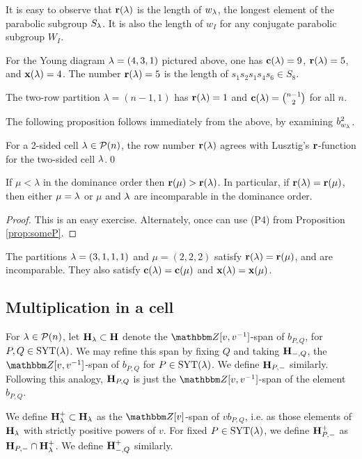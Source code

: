 It is easy to observe that $\mathbf{r}(\lambda)$ is the length of $w_\lambda$, the longest element of the parabolic subgroup $S_\lambda$. It is also the length of $w_I$ for any conjugate parabolic subgroup $W_I$.

\begin{example} For the Young diagram $\lambda=(4,3,1)$ pictured above, one has $\mathbf{c}(\lambda) = 9$, $\mathbf{r}(\lambda) = 5$, and $\mathbf{x}(\lambda)=4$. The number $\mathbf{r}(\lambda)=5$ is the length of $s_1 s_2 s_1 s_4 s_6 \in S_8$.  \end{example}

\begin{example}
The two-row partition $\lambda=(n-1,1)$ has $\mathbf{r}(\lambda)=1$ and $\mathbf{c}(\lambda)=\binom{n-1}{2}$ for all $n$.
\end{example}

The following proposition follows immediately from the above, by examining $b_{w_\lambda}^2$.

\begin{proposition}\label{prop:abEqualsrb} For a 2-sided cell $\lambda \in {\mathcal{P}}(n)$, the row number $\mathbf{r}(\lambda)$ agrees with Lusztig's $\mathbf{r}$-function for the two-sided cell $\lambda$.\qed
\end{proposition}

\begin{lemma} \label{lem:rowOrder}
If $\mu < \lambda$ in the dominance order then $\mathbf{r}(\mu) > \mathbf{r}(\lambda)$. In particular, if $\mathbf{r}(\lambda)=\mathbf{r}(\mu)$, then either $\mu=\lambda$ or $\mu$ and $\lambda$ are incomparable in the dominance order. \end{lemma}

\begin{proof} This is an easy exercise.  Alternately, once can use (P4) from Proposition \ref{prop:someP}. \end{proof}

\begin{example} The partitions $\lambda=(3,1,1,1)$ and $\mu=(2,2,2)$ satisfy $\mathbf{r}(\lambda)=\mathbf{r}(\mu)$, and are incomparable. They also satisfy $\mathbf{c}(\lambda) = \mathbf{c}(\mu)$ and $\mathbf{x}(\lambda) = \mathbf{x}(\mu)$. \end{example}

\subsection{Multiplication in a cell}
\label{subsec:morestill}

\begin{notation} \label{not:HBP-} For $\lambda \in {\mathcal{P}}(n)$, let ${\mathbf H}_\lambda \subset {\mathbf H}$ denote the $\Z[v,v\inv]$-span of $b_{P,Q}$, for $P,Q \in \operatorname{SYT}(\lambda)$. We may refine this span by fixing $Q$
and taking ${\mathbf H}_{-,Q}$, the $\Z[v,v\inv]$-span of $b_{P,Q}$ for $P \in \operatorname{SYT}(\lambda)$. We define ${\mathbf H}_{P,-}$ similarly. Following this analogy, ${\mathbf H}_{P,Q}$ is just the $\Z[v,v\inv]$-span of
the element $b_{P,Q}$.
	
We define ${\mathbf H}_\lambda^+ \subset {\mathbf H}_\lambda$ as the $\Z[v]$-span of $v b_{P,Q}$, i.e. as those elements of ${\mathbf H}_\lambda$ with strictly positive powers of $v$. For fixed $P \in \operatorname{SYT}(\lambda)$, we define
${\mathbf H}_{P,-}^+$ as ${\mathbf H}_{P,-} \cap {\mathbf H}_\lambda^+$. We define ${\mathbf H}_{-,Q}^+$ similarly. \end{notation}

